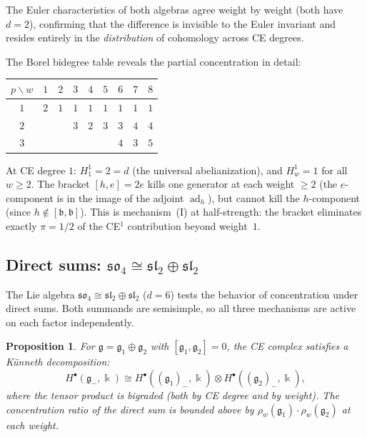 \documentclass[11pt,reqno]{amsart}
\theoremstyle{plain}
\newtheorem{proposition}[theorem]{Proposition}
\theoremstyle{definition}
\theoremstyle{remark}
\DeclareMathOperator{\ad}{ad}
\newcommand{\fg}{\mathfrak{g}}
\newcommand{\fb}{\mathfrak{b}}
\newcommand{\gminus}{\fg_{-}}
\newcommand{\kk}{\Bbbk}
\begin{document}
The Euler characteristics of both algebras agree weight by weight (both have
$d = 2$), confirming that the difference is invisible to the Euler invariant
and resides entirely in the \emph{distribution} of cohomology across CE
degrees.

The Borel bidegree table reveals the partial concentration in detail:

\begin{center}
 \begin{tabular}{c|cccccccc}
 \toprule
 $p \backslash w$ & $1$ & $2$ & $3$ & $4$ & $5$ & $6$ & $7$ & $8$ \\
 \midrule
 $1$ & $2$ & $1$ & $1$ & $1$ & $1$ & $1$ & $1$ & $1$ \\
 $2$ & & & $3$ & $2$ & $3$ & $3$ & $4$ & $4$ \\
 $3$ & & & & & & $4$ & $3$ & $5$ \\
 \bottomrule
 \end{tabular}
\end{center}

\noindent
At CE degree $1$: $H^1_1 = 2 = d$ (the universal abelianization), and
$H^1_w = 1$ for all $w \ge 2$. The bracket $[h, e] = 2e$ kills one
generator at each weight $\ge 2$ (the $e$-component is in the image of the
adjoint $\ad_h$), but cannot kill the $h$-component (since $h \notin [\fb,
\fb]$). This is mechanism~(I) at half-strength: the bracket eliminates
exactly $\pi = 1/2$ of the CE${}^1$ contribution beyond weight~$1$.


\subsection{Direct sums: $\mathfrak{so}_4 \cong \mathfrak{sl}_2 \oplus
\mathfrak{sl}_2$}
\label{sec:so4}

The Lie algebra $\mathfrak{so}_4 \cong \mathfrak{sl}_2 \oplus
\mathfrak{sl}_2$ ($d = 6$) tests the behavior of concentration under
direct sums. Both summands are semisimple, so all three mechanisms are
active on each factor independently.

\begin{proposition}\label{prop:direct-sum-CE}
 For $\fg = \fg_1 \oplus \fg_2$ with $[\fg_1, \fg_2] = 0$, the CE complex
 satisfies a K\"unneth decomposition:
 \[
 H^\bullet(\gminus, \kk) \cong H^\bullet((\fg_1)_-, \kk)
 \otimes H^\bullet((\fg_2)_-, \kk),
 \]
 where the tensor product is bigraded (both by CE degree and by weight).
 The concentration ratio of the direct sum is bounded above by
 $\rho_w(\fg_1) \cdot \rho_w(\fg_2)$ at each weight.
\end{proposition}
\end{document}
